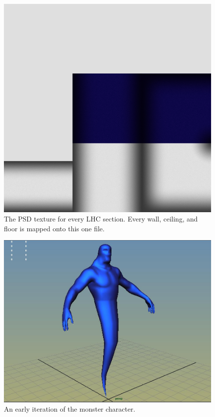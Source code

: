 \documentclass[a4paper,oneside]{memoir}
\begin{document}
	\begin{figure}[ht]
		\begin{center}
			\includegraphics[width=130mm]{../Screenshots/Appendices/lhc-texture}
			\caption{The PSD texture for every LHC section. Every wall, ceiling, and floor is mapped onto this one file.}
		\end{center}
	\end{figure}

	\begin{figure}[ht]
		\begin{center}
			\includegraphics[width=150mm]{../Screenshots/Appendices/monster-early}
			\caption{An early iteration of the monster character.}
		\end{center}
	\end{figure}
\end{document}
